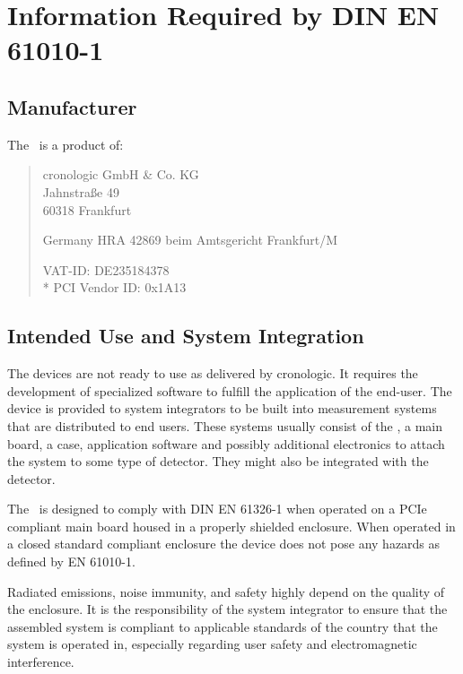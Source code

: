 \newpage
\section{Information Required by DIN EN 61010-1}
\subsection{Manufacturer\label{cp:manu}}

The \deviceName\ is a product of:\

\begin{quote}
    cronologic GmbH \& Co. KG\\
    Jahnstra\ss{}e 49\\
    60318 Frankfurt\par
    Germany
    \noindent HRA 42869 beim Amtsgericht Frankfurt/M\par
    \noindent VAT-ID: DE235184378 \\*
    \noindent PCI Vendor ID: 0x1A13
\end{quote}

\subsection{Intended Use and System Integration}
The devices are not ready to use as delivered by cronologic. It requires the
development of specialized software to fulfill the application of the
end-user. The device is provided to system integrators to be built into
measurement systems that are distributed to end users. These systems usually
consist of the \deviceName, a main board, a case, application software and
possibly additional electronics to attach the system to some type of detector.
They might also be integrated with the detector.\par

The \deviceName\ is designed to comply with DIN EN 61326-1 when operated on a
PCIe compliant main board housed in a properly shielded enclosure.  When
operated in a closed standard compliant enclosure the device does not pose any
hazards as defined by EN 61010-1.\par

Radiated emissions, noise immunity, and safety highly depend on the quality of
the enclosure.  It is the responsibility of the system integrator to ensure
that the assembled system is compliant to applicable standards of the country
that the system is operated in, especially regarding user safety and
electromagnetic interference. \par
    
